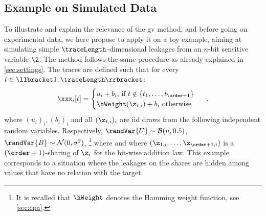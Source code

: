 \subsection{Example on Simulated Data}
\label{sec:toy_example}
To illustrate and explain the relevance of the \gls{gv} method, and before going on experimental data, we here propose to apply it on a toy example, aiming at simulating simple \(\traceLength\)-dimensional leakages from an \(n\)-bit sensitive variable \(\Z\).
The method follows the same procedure as already explained in \autoref{sec:settings}.
The traces are defined such that for every \(t \in \llbracket1, \traceLength\rrbracket\):
\begin{equation}
	\xxx_i[t] =
	\begin{cases}
		u_i + b_i \mbox{, if } t \notin \{t_1, \ldots, t_{\order+1}\} \\
		\hWeight(\z_{t,i}) + b_i \mbox{ otherwise}
	\end{cases}
	\enspace ,
\end{equation}
where \((u_i)_i, (b_i)_i\) and all \((\z_{t,i})_i\) are \gls{iid} draws from the following independent random variables.
Respectively, \(\randVar{U} \sim \mathcal{B}(n, 0.5)\), \(\randVar{B} \sim \mathcal{N}(0, \sigma^2)\),%
\footnote{
	It is recalled that \(\hWeight\) denotes the Hamming weight function, see \autoref{sec:cpa}.
} 
where  and where \((\z_{1,i}, \ldots, \z_{\order+1,i})\) is a \((\order+1)\)-sharing of \(\z_i\) for the bit-wise addition law.
This example corresponds to a situation where the leakages on the shares  are hidden among values that have no relation with the target.


